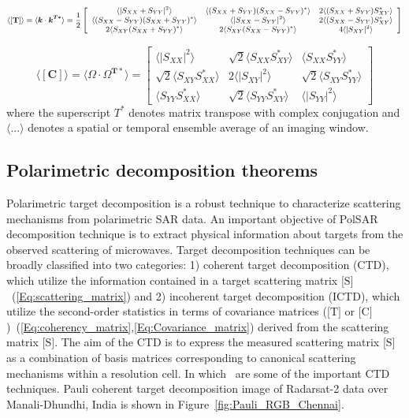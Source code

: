 \begin{equation}
\small
\mathbf{\langle[T]\rangle}=\langle \bm{k}\cdot \bm{k^{T*}}\rangle=\frac{1}{2}\left[\begin{array}{ccc}
\langle|S_{XX}+S_{YY}|^2\rangle & \langle(S_{XX}+S_{YY})(S_{XX}-S_{YY})^*\rangle & 2\langle(S_{XX}+S_{YY})S_{XY}^*\rangle\\ 
\langle(S_{XX}-S_{YY})(S_{XX}+S_{YY})^*\rangle & \langle|S_{XX}-S_{YY}|^2\rangle & 2\langle(S_{XX}-S_{YY})S_{XY}^*\rangle \\
2\langle S_{XY}(S_{XX}+S_{YY})^*\rangle & 2\langle S_{XY}(S_{XX}-S_{YY})^*\rangle & 4\langle |S_{XY}|^2\rangle
\end{array}\right]
\label{Eq:coherency_matrix}
\end{equation}

\begin{equation}
\mathbf{\langle[C]\rangle}=\langle \bm{\varOmega}\cdot \bm{\varOmega^{T*}}\rangle=\left[\begin{array}{ccc}
\langle|S_{XX}|^2\rangle & \sqrt{2}\langle S_{XX}S_{XY}^*\rangle & \langle S_{XX}S_{YY}^*\rangle\\ 
\sqrt{2}\langle S_{XY}S_{XX}^*\rangle & 2\langle|S_{XY}|^2\rangle & \sqrt{2}\langle S_{XY}S_{YY}^*\rangle \\
\langle S_{YY}S_{XX}^*\rangle & \sqrt{2}\langle S_{YY}S_{XY}^*\rangle & \langle|S_{YY}|^2\rangle
\end{array}\right]
\label{Eq:Covariance_matrix}
\end{equation}
where the superscript $T^{*}$ denotes matrix transpose with complex conjugation and $\langle ... \rangle$ denotes a spatial or temporal ensemble average of an imaging window.  

\subsection{Polarimetric decomposition theorems}
Polarimetric target decomposition is a robust technique to characterize scattering mechanisms from polarimetric SAR data. An important objective of PolSAR decomposition technique is to extract physical information about targets from the observed scattering of microwaves. Target decomposition techniques can be broadly classified into two categories: 1) coherent target decomposition (CTD), which utilize the information contained in a target scattering matrix $\mbox{[S]}$~(\ref{Eq:scattering_matrix}) and 2) incoherent target decomposition (ICTD), which utilize the second-order statistics in terms of covariance matrices ($\mbox{[T]}$ or $\mbox{[C]}$)~(\ref{Eq:coherency_matrix},\ref{Eq:Covariance_matrix}) derived from the scattering matrix $\mbox{[S]}$. The aim of the CTD is to express the measured scattering matrix $\mbox{[S]}$ as a combination of basis matrices corresponding to canonical scattering mechanisms within a resolution cell. In which~\citep{huynen1970,krogager1990new,Cameron96,corr2002alternative} are some of the important CTD techniques. Pauli coherent target decomposition image of Radarsat-2 data over Manali-Dhundhi, India is shown in Figure~\ref{fig:Pauli_RGB_Chennai}.

